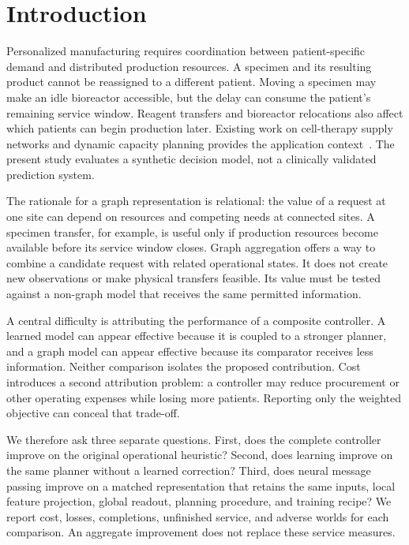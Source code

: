 \documentclass[preprint,12pt]{elsarticle}
\begin{document}
\section{Introduction}
Personalized manufacturing requires coordination between patient-specific demand
and distributed production resources. A specimen and its resulting product
cannot be reassigned to a different patient. Moving a specimen may make an idle
bioreactor accessible, but the delay can consume the patient's remaining service
window. Reagent transfers and bioreactor relocations also affect which patients
can begin production later. Existing work on cell-therapy supply networks and
dynamic capacity planning provides the application context~\cite{Wang2023,Tseng2025}.
The present study evaluates a synthetic decision model, not a clinically
validated prediction system.

The rationale for a graph representation is relational: the value of a request
at one site can depend on resources and competing needs at connected sites.
A specimen transfer, for example, is useful only if production resources become
available before its service window closes. Graph aggregation offers a way to
combine a candidate request with related operational states. It does not create
new observations or make physical transfers feasible. Its value must be tested
against a non-graph model that receives the same permitted information.

A central difficulty is attributing the performance of a composite controller.
A learned model can appear effective because it is coupled to a stronger
planner, and a graph model can appear effective because its comparator receives
less information. Neither comparison isolates the proposed contribution.
Cost introduces a second attribution problem: a controller may reduce procurement
or other operating expenses while losing more patients. Reporting only the
weighted objective can conceal that trade-off.

We therefore ask three separate questions. First, does the complete controller
improve on the original operational heuristic? Second, does learning improve on
the same planner without a learned correction? Third, does neural message passing
improve on a matched representation that retains the same inputs, local feature
projection, global readout, planning procedure, and training recipe? We report
cost, losses, completions, unfinished service, and adverse worlds for each
comparison. An aggregate improvement does not replace these service measures.
\end{document}
